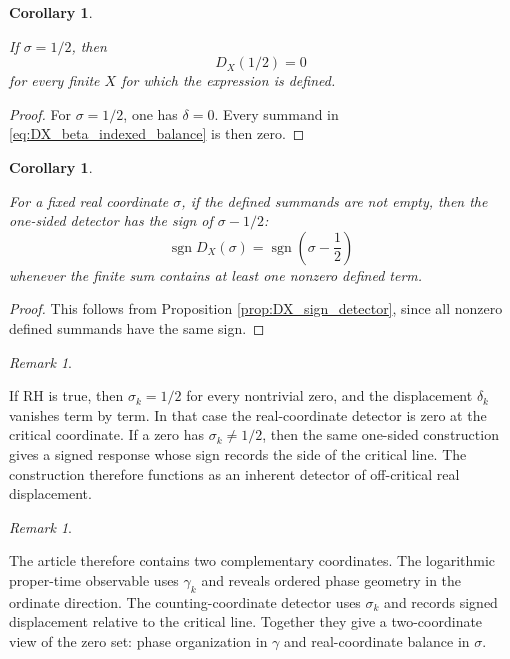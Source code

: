\documentclass[11pt]{amsart}
\numberwithin{equation}{section}
\theoremstyle{plain}
\newtheorem{corollary}[theorem]{Corollary}
\theoremstyle{definition}
\theoremstyle{remark}
\newtheorem{remark}[theorem]{Remark}
\begin{document}
\begin{corollary}
\label{cor:DX_zero_when_sigma_half}

If \(\sigma=1/2\), then
\begin{equation}
D_X(1/2)=0
\label{eq:DX_zero_sigma_half}
\end{equation}
for every finite \(X\) for which the expression is defined.

\end{corollary}

\begin{proof}
For \(\sigma=1/2\), one has \(\delta=0\).  Every summand in \eqref{eq:DX_beta_indexed_balance} is then zero.
\end{proof}

\begin{corollary}
\label{cor:DX_signed_response_offcritical}

For a fixed real coordinate \(\sigma\), if the defined summands are not empty, then the one-sided detector has the sign of \(\sigma-1/2\):
\begin{equation}
\operatorname{sgn} D_X(\sigma)
=
\operatorname{sgn}\left(\sigma-\frac12\right)
\label{eq:DX_signed_response_offcritical}
\end{equation}
whenever the finite sum contains at least one nonzero defined term.

\end{corollary}

\begin{proof}
This follows from Proposition \ref{prop:DX_sign_detector}, since all nonzero defined summands have the same sign.
\end{proof}

\begin{remark}
\label{rem:DX_interpretation_if_RH_or_not}

If RH is true, then \(\sigma_k=1/2\) for every nontrivial zero, and the displacement \(\delta_k\) vanishes term by term.  In that case the real-coordinate detector is zero at the critical coordinate.  If a zero has \(\sigma_k\neq1/2\), then the same one-sided construction gives a signed response whose sign records the side of the critical line.  The construction therefore functions as an inherent detector of off-critical real displacement.

\end{remark}

\begin{remark}
\label{rem:sigma_gamma_two_coordinate_structure}

The article therefore contains two complementary coordinates.  The logarithmic proper-time observable uses \(\gamma_k\) and reveals ordered phase geometry in the ordinate direction.  The counting-coordinate detector uses \(\sigma_k\) and records signed displacement relative to the critical line.  Together they give a two-coordinate view of the zero set: phase organization in \(\gamma\) and real-coordinate balance in \(\sigma\).

\end{remark}
\end{document}
